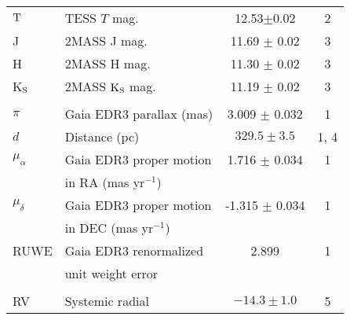 \begin{table*}
\begin{tabular}{llcc}
${\rm T}$\dotfill     & TESS $T$ mag.\dotfill     & 12.53$\pm$0.02 & 2\\
J\dotfill			& 2MASS J mag.\dotfill & 11.69  $\pm$ 0.02	& 3	\\
H\dotfill			& 2MASS H mag.\dotfill & 11.30 $\pm$ 0.02	    &  3	\\
K$_{\rm S}$\dotfill			& 2MASS ${\rm K_S}$ mag.\dotfill & 11.19 $\pm$ 0.02 &  3	\\
\\
$\pi$\dotfill & Gaia EDR3 parallax (mas) \dotfill & 3.009 $\pm$ 0.032 &  1 \\
$d$\dotfill & Distance (pc)\dotfill & $329.5 \pm 3.5$ & 1, 4 \\
$\mu_{\alpha}$\dotfill		& Gaia EDR3 proper motion\dotfill & 1.716 $\pm$ 0.034 & 1 \\
                    & \hspace{3pt} in RA (mas yr$^{-1}$)	&  \\
$\mu_{\delta}$\dotfill		& Gaia EDR3 proper motion\dotfill 	&  -1.315 $\pm$ 0.034 &  1 \\
                    & \hspace{3pt} in DEC (mas yr$^{-1}$) &  \\
RUWE\dotfill		& Gaia EDR3 renormalized\dotfill 	&  2.899 &  1 \\
                    & \hspace{3pt} unit weight error &  \\
%
\\
RV\dotfill & Systemic radial \hspace{9pt}\dotfill  & $-14.3 \pm 1.0$ & 5 \\

\end{tabular}
\end{table*}

